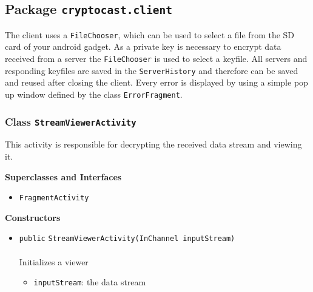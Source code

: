 \subsection{Package \lstinline!cryptocast.client!}
The client uses a \lstinline|FileChooser|, which can be used to select a file from the SD card of your android gadget.
 As a private key is necessary to encrypt data received from a server the \lstinline|FileChooser| is used to select a keyfile.
 All servers and responding keyfiles are saved in the \lstinline|ServerHistory| and therefore can be saved and reused after closing the client.
 Every error is displayed by using a simple pop up window defined by the class \lstinline|ErrorFragment|.
\subsubsection{Class \lstinline|StreamViewerActivity|}
This activity is responsible for decrypting the received data
 stream and viewing it. \\
\noindent\begin{minipage}[t]{5cm}
\vspace{0.3em}
\hspace*{2em}
\vspace{0.3em}
\end{minipage}



\textbf{\sffamily Superclasses and Interfaces}
\begin{itemize}
\item \lstinline|FragmentActivity|
\end{itemize}


\textbf{\sffamily Constructors}
\begin{itemize}
\item \lstinline|public| \lstinline|StreamViewerActivity|\lstinline|(InChannel inputStream)|\\ \\[-0.6em]
Initializes a viewer
\begin{itemize}
\item \lstinline|inputStream|: the data stream
\end{itemize}



\end{itemize}


